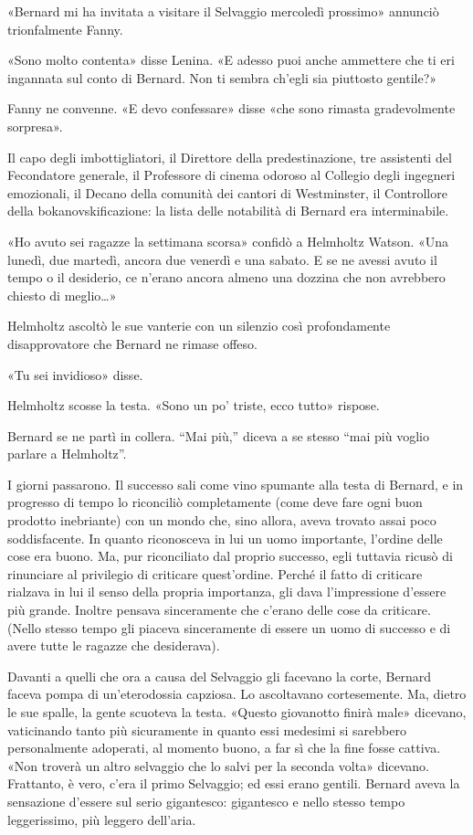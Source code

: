 \documentclass[
a5paper, %
10pt, %
twoside, 
onecolumn, %
openany, %
]{memoir}
\begin{document}
«Bernard mi ha invitata a visitare il Selvaggio mercoledì prossimo» annunciò trionfalmente Fanny.

«Sono molto contenta» disse Lenina. «E adesso puoi anche ammettere che ti eri ingannata sul conto di Bernard. Non ti sembra ch’egli sia piuttosto gentile?»

Fanny ne convenne. «E devo confessare» disse «che sono rimasta gradevolmente sorpresa».

Il capo degli imbottigliatori, il Direttore della predestinazione, tre assistenti del Fecondatore generale, il Professore di cinema odoroso al Collegio degli ingegneri emozionali, il Decano della comunità dei cantori di Westminster, il Controllore della bokanovskificazione: la lista delle notabilità di Bernard era interminabile.

«Ho avuto sei ragazze la settimana scorsa» confidò a Helmholtz Watson. «Una lunedì, due martedì, ancora due venerdì e una sabato. E se ne avessi avuto il tempo o il desiderio, ce n’erano ancora almeno una dozzina che non avrebbero chiesto di meglio…»

Helmholtz ascoltò le sue vanterie con un silenzio così profondamente disapprovatore che Bernard ne rimase offeso.

«Tu sei invidioso» disse.

Helmholtz scosse la testa. «Sono un po’ triste, ecco tutto» rispose.

Bernard se ne partì in collera. “Mai più,” diceva a se stesso “mai più voglio parlare a Helmholtz”.

I giorni passarono. Il successo sali come vino spumante alla testa di Bernard, e in progresso di tempo lo riconciliò completamente (come deve fare ogni buon prodotto inebriante) con un mondo che, sino allora, aveva trovato assai poco soddisfacente. In quanto riconosceva in lui un uomo importante, l’ordine delle cose era buono. Ma, pur riconciliato dal proprio successo, egli tuttavia ricusò di rinunciare al privilegio di criticare quest’ordine. Perché il fatto di criticare rialzava in lui il senso della propria importanza, gli dava l’impressione d’essere più grande. Inoltre pensava sinceramente che c’erano delle cose da criticare. (Nello stesso tempo gli piaceva sinceramente di essere un uomo di successo e di avere tutte le ragazze che desiderava).

Davanti a quelli che ora a causa del Selvaggio gli facevano la corte, Bernard faceva pompa di un’eterodossia capziosa. Lo ascoltavano cortesemente. Ma, dietro le sue spalle, la gente scuoteva la testa. «Questo giovanotto finirà male» dicevano, vaticinando tanto più sicuramente in quanto essi medesimi si sarebbero personalmente adoperati, al momento buono, a far sì che la fine fosse cattiva. «Non troverà un altro selvaggio che lo salvi per la seconda volta» dicevano. Frattanto, è vero, c’era il primo Selvaggio; ed essi erano gentili. Bernard aveva la sensazione d’essere sul serio gigantesco: gigantesco e nello stesso tempo leggerissimo, più leggero dell’aria.
\end{document}
